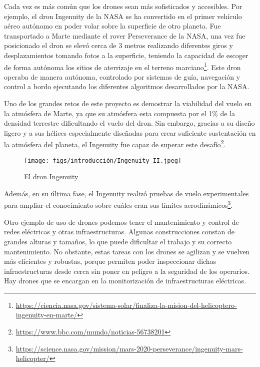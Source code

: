 Cada vez es más común que los drones sean más sofisticados y accesibles. Por ejemplo, el dron Ingenuity de la NASA se ha convertido en el primer vehículo aéreo autónomo en poder volar
sobre la superficie de otro planeta. Fue transportado a Marte mediante el rover Perseverance de la NASA, una vez fue posicionado el dron se elevó cerca de 3 metros realizando 
diferentes giros y desplazamientos tomando fotos a la superficie, teniendo la capacidad de escoger de forma autónoma los sitios de aterrizaje en el terreno marciano\footnote{\url{https://ciencia.nasa.gov/sistema-solar/finaliza-la-mision-del-helicoptero-ingenuity-en-marte/}}.
Este dron operaba de manera autónoma, controlado por sistemas de guía, navegación y control a bordo ejecutando los diferentes algoritmos desarrollados por la NASA. 

Uno de los grandes retos de este proyecto es demostrar la viabilidad del vuelo en la atmósfera de Marte, ya que su atmósfera esta compuesta por el 1\% de la densidad terrestre
dificultando el vuelo del dron. Sin embargo, gracias a su diseño ligero y a sus hélices especialmente diseñadas para crear suficiente sustentación en la atmósfera del planeta, el Ingenuity 
fue capaz de superar este desafío\footnote{\url{https://www.bbc.com/mundo/noticias-56738201}}. 
\begin{figure} [H]
  \begin{center}
    \texttt{[image: figs/introducción/Ingenuity\_II.jpeg]}
  \end{center}
  \caption{El dron Ingenuity}
  \label{fig:Ingenuity}
  \vspace{-1.5em}
\end{figure}

Además, en su última fase, el Ingenuity realizó pruebas de vuelo experimentales para ampliar el conocimiento sobre cuáles eran sus límites aerodinámicos\footnote{\url{https://science.nasa.gov/mission/mars-2020-perseverance/ingenuity-mars-helicopter/}}.

Otro ejemplo de uso de drones podemos tener el mantenimiento y control de redes eléctricas y otras infraestructuras. Algunas construcciones constan de grandes alturas y tamaños, lo que puede
dificultar el trabajo y su correcto mantenimiento. No obstante, estas tareas con los drones se agilizan y se vuelven más eficientes y robustas, porque permiten poder
inspeccionar dichas infraestructuras desde cerca sin poner en peligro a la seguridad de los operarios. 
Hay drones que se encargan en la monitorización de infraestructuras eléctricas. 

